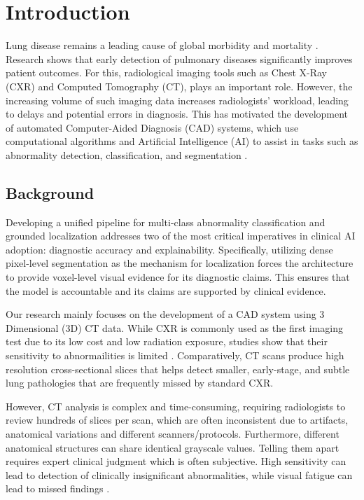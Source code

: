 \chapter{Introduction}
Lung disease remains a leading cause of global morbidity and mortality \cite{murray2022global}. Research shows that early
detection of pulmonary diseases significantly improves patient outcomes. For this, radiological imaging tools
such as Chest X-Ray (CXR) and Computed Tomography (CT), plays an important role. However, the increasing volume of
such imaging data increases radiologists' workload, leading to delays and potential errors in diagnosis.
This has motivated the development of automated Computer-Aided Diagnosis (CAD) systems, which use computational algorithms
and Artificial Intelligence (AI) to assist in tasks such as abnormality detection, classification, and segmentation \cite{doi2007computer}.

\section{Background}

Developing a unified pipeline for multi-class abnormality classification and grounded localization
addresses two of the most critical imperatives in clinical AI adoption: diagnostic accuracy and explainability.
Specifically, utilizing dense pixel-level segmentation as the mechanism for localization forces the architecture to
provide voxel-level visual evidence for its diagnostic claims. This ensures that the model is accountable and its
claims are supported by clinical evidence.

Our research mainly focuses on the development of a CAD system using 3 Dimensional (3D) CT data. While CXR is commonly
used as the first imaging test due to its low cost and low radiation exposure, studies show that their sensitivity
to abnormailities is limited \cite{borakati2020diagnostic}. Comparatively, CT scans produce high resolution
cross-sectional slices that helps detect smaller, early-stage, and subtle lung pathologies that are
frequently missed by standard CXR.

However, CT analysis is complex and time-consuming, requiring radiologists to review hundreds of slices per scan,
which are often inconsistent due to artifacts, anatomical variations and different scanners/protocols.
Furthermore, different anatomical structures can share identical grayscale values. Telling them apart
requires expert clinical judgment which is often subjective. High sensitivity can lead to detection of 
clinically insignificant abnormalities, while visual fatigue can lead to missed findings \cite{mccreadie2009eight}.

